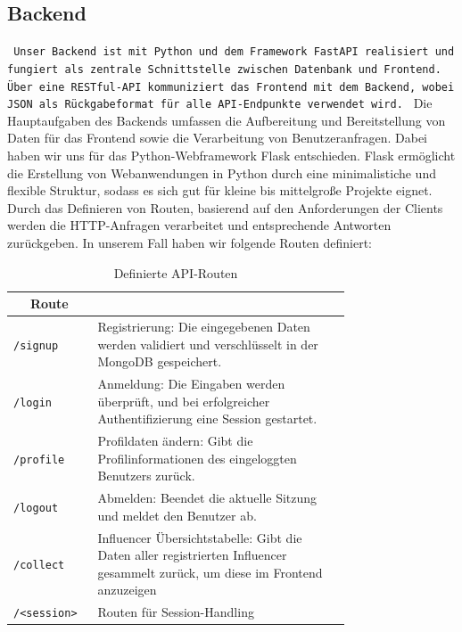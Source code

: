 \documentclass[conference,a4paper,flushend]{cs-techrep}
\begin{document}
\subsection{Backend}
\texttt{
Unser Backend ist mit Python und dem Framework FastAPI realisiert und fungiert als zentrale Schnittstelle zwischen Datenbank und Frontend. Über eine RESTful-API kommuniziert das Frontend mit dem Backend, wobei JSON als Rückgabeformat für alle API-Endpunkte verwendet wird.
}
Die Hauptaufgaben des Backends umfassen die Aufbereitung und Bereitstellung von Daten für das Frontend sowie die Verarbeitung von Benutzeranfragen. Dabei haben wir uns für das Python-Webframework Flask entschieden. Flask ermöglicht die Erstellung von Webanwendungen in Python durch eine minimalistiche und flexible Struktur, sodass es sich gut für kleine bis mittelgroße Projekte eignet. Durch das Definieren von Routen, basierend auf den Anforderungen der Clients werden die HTTP-Anfragen verarbeitet und entsprechende Antworten zurückgeben. In unserem Fall haben wir folgende Routen definiert:

\begin{table}[h]
    \centering
    \begin{tabular}{|l|>{\raggedright\arraybackslash}m{0.75\linewidth}|}
        \hline
  	 \multicolumn{1}{|c|}{\textbf{Route}} & \multicolumn{1}{c|}{\textbf{Zweck der Route}} \\
        \hline
        \verb|/signup| & Registrierung: Die eingegebenen Daten werden validiert und verschlüsselt in der MongoDB gespeichert. \\
        \hline
        \verb|/login| & Anmeldung: Die Eingaben werden überprüft, und bei erfolgreicher Authentifizierung eine Session gestartet. \\
        \hline
        \verb|/profile| & Profildaten ändern: Gibt die Profilinformationen des eingeloggten Benutzers zurück. \\
        \hline
        \verb|/logout| & Abmelden: Beendet die aktuelle Sitzung und meldet den Benutzer ab. \\
        \hline
        \verb|/collect| & Influencer Übersichtstabelle: Gibt die Daten aller registrierten Influencer gesammelt zurück, um diese im Frontend anzuzeigen \\
        \hline
	   \verb|/<session>| & Routen für Session-Handling \\
        \hline
    \end{tabular}
    \caption{Definierte API-Routen}
    \label{tab:api-routes}
\end{table}
\end{document}
